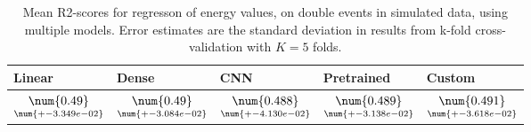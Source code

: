\begin{table}
\centering
\caption{
Mean R2-scores for regresson of energy values, on double events in simulated data, using multiple models. 
Error estimates are the standard deviation in results from k-fold cross-validation 
with $K=5$ folds.
}
\label{tab:regression-simulated-double-energy-r2}
\begin{tabular}{lllll}
\toprule
                                            Linear &                                              Dense &                                                 CNN &                                          Pretrained &                                              Custom \\
\midrule
 $\underset{\num{+- 3.349e-02 }  }{\num{ 0.49 } }$ &  $\underset{\num{+- 3.084e-02 }  }{\num{ 0.49 } }$ &  $\underset{\num{+- 4.130e-02 }  }{\num{ 0.488 } }$ &  $\underset{\num{+- 3.138e-02 }  }{\num{ 0.489 } }$ &  $\underset{\num{+- 3.618e-02 }  }{\num{ 0.491 } }$ \\
\bottomrule
\end{tabular}
\end{table}
